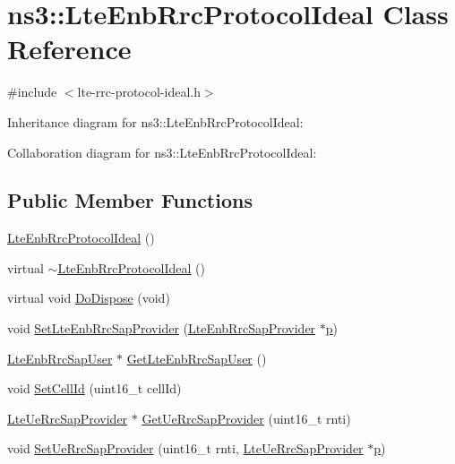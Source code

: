 \hypertarget{classns3_1_1LteEnbRrcProtocolIdeal}{}\section{ns3\+:\+:Lte\+Enb\+Rrc\+Protocol\+Ideal Class Reference}
\label{classns3_1_1LteEnbRrcProtocolIdeal}


{\ttfamily \#include $<$lte-\/rrc-\/protocol-\/ideal.\+h$>$}



Inheritance diagram for ns3\+:\+:Lte\+Enb\+Rrc\+Protocol\+Ideal\+:


Collaboration diagram for ns3\+:\+:Lte\+Enb\+Rrc\+Protocol\+Ideal\+:
\subsection*{Public Member Functions}
\begin{DoxyCompactItemize}
\item 
\hyperlink{classns3_1_1LteEnbRrcProtocolIdeal_a4a901a2ec9505e76d6bc6307617a5502}{Lte\+Enb\+Rrc\+Protocol\+Ideal} ()
\item 
virtual \hyperlink{classns3_1_1LteEnbRrcProtocolIdeal_af2b062b20fde57e554a87c6ac42b2fc0}{$\sim$\+Lte\+Enb\+Rrc\+Protocol\+Ideal} ()
\item 
virtual void \hyperlink{classns3_1_1LteEnbRrcProtocolIdeal_a4b1dd41b2b97b80107c6ddef8a1f0b65}{Do\+Dispose} (void)
\item 
void \hyperlink{classns3_1_1LteEnbRrcProtocolIdeal_a770059e4057b77b8eb2bbba477d47f04}{Set\+Lte\+Enb\+Rrc\+Sap\+Provider} (\hyperlink{classns3_1_1LteEnbRrcSapProvider}{Lte\+Enb\+Rrc\+Sap\+Provider} $\ast$\hyperlink{lte__link__budget__x2__handover__measures_8m_ac9de518908a968428863f829398a4e62}{p})
\item 
\hyperlink{classns3_1_1LteEnbRrcSapUser}{Lte\+Enb\+Rrc\+Sap\+User} $\ast$ \hyperlink{classns3_1_1LteEnbRrcProtocolIdeal_a9f7468d01538ce7a2a11de78c4346e4a}{Get\+Lte\+Enb\+Rrc\+Sap\+User} ()
\item 
void \hyperlink{classns3_1_1LteEnbRrcProtocolIdeal_a3aee5486dff9749a4e6453496a2ab9e7}{Set\+Cell\+Id} (uint16\+\_\+t cell\+Id)
\item 
\hyperlink{classns3_1_1LteUeRrcSapProvider}{Lte\+Ue\+Rrc\+Sap\+Provider} $\ast$ \hyperlink{classns3_1_1LteEnbRrcProtocolIdeal_afcb6293259f99029b30758071386221f}{Get\+Ue\+Rrc\+Sap\+Provider} (uint16\+\_\+t rnti)
\item 
void \hyperlink{classns3_1_1LteEnbRrcProtocolIdeal_a17ca5d205ebab04f05bcdddb33f7abb9}{Set\+Ue\+Rrc\+Sap\+Provider} (uint16\+\_\+t rnti, \hyperlink{classns3_1_1LteUeRrcSapProvider}{Lte\+Ue\+Rrc\+Sap\+Provider} $\ast$\hyperlink{lte__link__budget__x2__handover__measures_8m_ac9de518908a968428863f829398a4e62}{p})
\end{DoxyCompactItemize}
